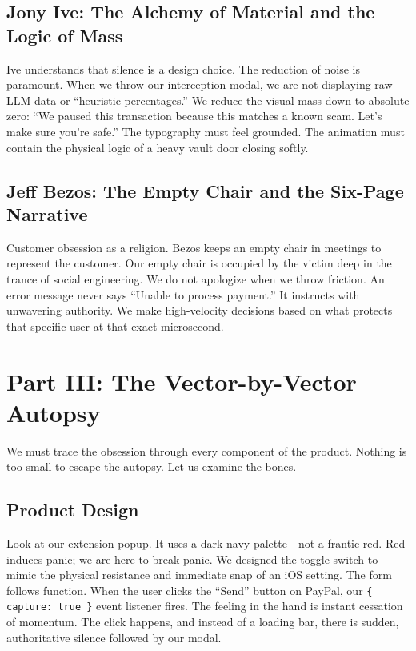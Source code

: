 \documentclass[11pt, letterpaper]{article}
\begin{document}
\subsection*{Jony Ive: The Alchemy of Material and the Logic of Mass}
Ive understands that silence is a design choice. The reduction of noise is paramount. When we throw our interception modal, we are not displaying raw LLM data or ``heuristic percentages.'' We reduce the visual mass down to absolute zero: ``We paused this transaction because this matches a known scam. Let's make sure you're safe.'' The typography must feel grounded. The animation must contain the physical logic of a heavy vault door closing softly.

\subsection*{Jeff Bezos: The Empty Chair and the Six-Page Narrative}
Customer obsession as a religion. Bezos keeps an empty chair in meetings to represent the customer. Our empty chair is occupied by the victim deep in the trance of social engineering. We do not apologize when we throw friction. An error message never says ``Unable to process payment.'' It instructs with unwavering authority. We make high-velocity decisions based on what protects that specific user at that exact microsecond.

\section*{Part III: The Vector-by-Vector Autopsy}

We must trace the obsession through every component of the product. Nothing is too small to escape the autopsy. Let us examine the bones.

\subsection*{Product Design}
Look at our extension popup. It uses a dark navy palette---not a frantic red. Red induces panic; we are here to break panic. We designed the toggle switch to mimic the physical resistance and immediate snap of an iOS setting. The form follows function. When the user clicks the ``Send'' button on PayPal, our \texttt{\{ capture: true \}} event listener fires. The feeling in the hand is instant cessation of momentum. The click happens, and instead of a loading bar, there is sudden, authoritative silence followed by our modal.
\end{document}
